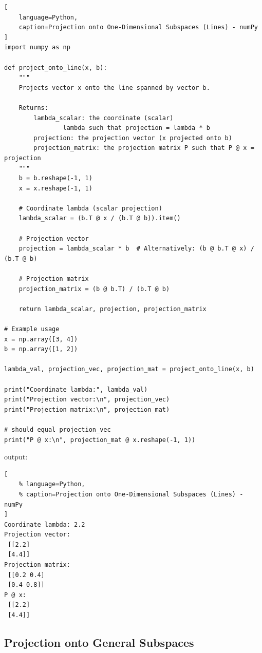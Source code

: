 \begin{lstlisting}[
    language=Python,
    caption=Projection onto One-Dimensional Subspaces (Lines) - numPy
]
import numpy as np

def project_onto_line(x, b):
    """
    Projects vector x onto the line spanned by vector b.

    Returns:
        lambda_scalar: the coordinate (scalar)
                lambda such that projection = lambda * b
        projection: the projection vector (x projected onto b)
        projection_matrix: the projection matrix P such that P @ x = projection
    """
    b = b.reshape(-1, 1)
    x = x.reshape(-1, 1)

    # Coordinate lambda (scalar projection)
    lambda_scalar = (b.T @ x / (b.T @ b)).item()

    # Projection vector
    projection = lambda_scalar * b  # Alternatively: (b @ b.T @ x) / (b.T @ b)

    # Projection matrix
    projection_matrix = (b @ b.T) / (b.T @ b)

    return lambda_scalar, projection, projection_matrix

# Example usage
x = np.array([3, 4])
b = np.array([1, 2])

lambda_val, projection_vec, projection_mat = project_onto_line(x, b)

print("Coordinate lambda:", lambda_val)
print("Projection vector:\n", projection_vec)
print("Projection matrix:\n", projection_mat)

# should equal projection_vec
print("P @ x:\n", projection_mat @ x.reshape(-1, 1))
\end{lstlisting}

output:

\begin{lstlisting}[
    % language=Python,
    % caption=Projection onto One-Dimensional Subspaces (Lines) - numPy
]
Coordinate lambda: 2.2
Projection vector:
 [[2.2]
 [4.4]]
Projection matrix:
 [[0.2 0.4]
 [0.4 0.8]]
P @ x:
 [[2.2]
 [4.4]]
\end{lstlisting}









\subsection{Projection onto General Subspaces}

